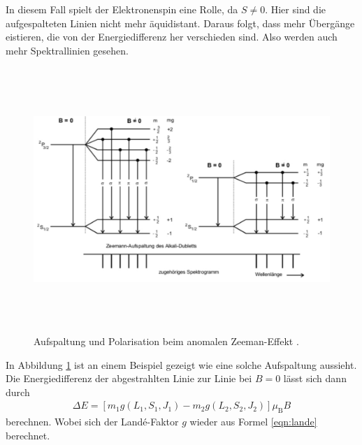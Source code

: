 In diesem Fall spielt der Elektronenspin eine Rolle, da $S\neq 0$. Hier sind die aufgespalteten Linien nicht mehr äquidistant. Daraus folgt, dass mehr Übergänge eistieren, die von der Energiedifferenz her verschieden sind. Also werden auch mehr Spektrallinien gesehen.
\begin{figure}
  \centering
  \includegraphics[height=10cm]{besuchInDerNacktmullAufzuchtstation/anomal.pdf}
  \caption{Aufspaltung und Polarisation beim anomalen Zeeman-Effekt \cite{anleitung}.}
  \label{fig:anomal}
\end{figure}
In Abbildung \ref{fig:anomal} ist an einem Beispiel gezeigt wie eine solche Aufspaltung aussieht.
Die Energiedifferenz der abgestrahlten Linie zur Linie bei $B = 0$ lässt sich dann durch
\begin{align}
  \Delta E = [m_1 g(L_1, S_1, J_1) - m_2 g(L_2, S_2, J_2)]\mu_\text{B} B\label{eqn:aufspaltungAnomal}
\end{align}
berechnen. Wobei sich der Landé-Faktor $g$ wieder aus Formel \eqref{eqn:lande} berechnet.


